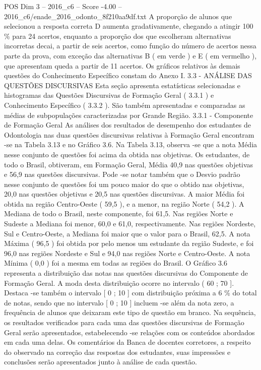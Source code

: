 \begin{textsample}{POS Dim 3 – 2016\_c6 – Score -4.00 – 2016\_c6/enade\_2016\_odonto\_8f210aa9df.txt}
A proporção de alunos que selecionou a resposta correta D aumenta gradativamente, chegando a atingir 100 \% para 24 acertos, enquanto a proporção dos que escolheram alternativas incorretas decai, a partir de seis acertos, como função do número de acertos nessa parte da prova, com exceção das alternativas B ( em verde ) e E ( em vermelho ), que apresentam queda a partir de 11 acertos.
Os gráficos relativos às demais questões do Conhecimento Específico constam do Anexo I. 3.3 - ANÁLISE DAS QUESTÕES DISCURSIVAS Esta seção apresenta estatísticas selecionadas e histogramas das Questões Discursivas de Formação Geral ( 3.3.1 ) e Conhecimento Específico ( 3.3.2 ).
São também apresentadas e comparadas as médias de subpopulações caracterizadas por Grande Região. 3.3.1 - Componente de Formação Geral As análises dos resultados de desempenho dos estudantes de Odontologia nas duas questões discursivas relativas à Formação Geral encontram -se na Tabela 3.13 e no Gráfico 3.6.
Na Tabela 3.13, observa -se que a nota Média nesse conjunto de questões foi acima da obtida nas objetivas.
Os estudantes, de todo o Brasil, obtiveram, em Formação Geral, Média 40,9 nas questões objetivas e 56,9 nas questões discursivas.
Pode -se notar também que o Desvio padrão nesse conjunto de questões foi um pouco maior do que o obtido nas objetivas, 20,0 nas questões objetivas e 20,5 nas questões discursivas.
A maior Média foi obtida na região Centro-Oeste ( 59,5 ), e a menor, na região Norte ( 54,2 ).
A Mediana de todo o Brasil, neste componente, foi 61,5.
Nas regiões Norte e Sudeste a Mediana foi menor, 60,0 e 61,0, respectivamente.
Nas regiões Nordeste, Sul e Centro-Oeste, a Mediana foi maior que o valor para o Brasil, 62,5.
A nota Máxima ( 96,5 ) foi obtida por pelo menos um estudante da região Sudeste, e foi 96,0 nas regiões Nordeste e Sul e 94,0 nas regiões Norte e Centro-Oeste.
A nota Mínima ( 0,0 ) foi a mesma em todas as regiões do Brasil.
O Gráfico 3.6 representa a distribuição das notas nas questões discursivas do Componente de Formação Geral.
A moda desta distribuição ocorre no intervalo ( 60 ; 70 ].
Destaca -se também o intervalo [ 0 ; 10 ] com distribuição próxima a 6 \% do total de notas, sendo que no intervalo [ 0 ; 10 ] incluem -se além da nota zero, a frequência de alunos que deixaram este tipo de questão em branco.
Na sequência, os resultados verificados para cada uma das questões discursivas de Formação Geral serão apresentados, estabelecendo -se relações com os conteúdos abordados em cada uma delas.
Os comentários da Banca de docentes corretores, a respeito do observado na correção das respostas dos estudantes, suas impressões e conclusões serão apresentados junto à análise de cada questão.

\end{textsample}
